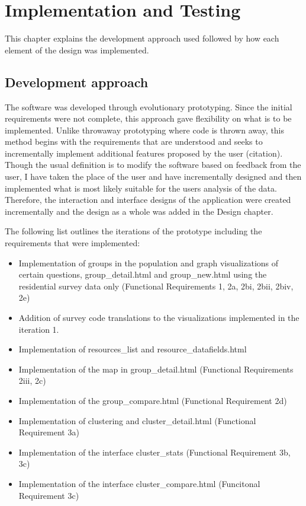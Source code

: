 \chapter{Implementation and Testing} \label{ch:implementation}
This chapter explains the development approach used followed by how each element of the design was implemented.


\section{Development approach} 
\label{sec:developmentapproach}
The software was developed through evolutionary prototyping. Since the initial requirements were not complete, this approach gave flexibility on what is to be implemented. Unlike throwaway prototyping where code is thrown away, this method begins with the requirements that are understood and seeks to incrementally implement additional features proposed by the user (citation). Though the usual definition is to modify the software based on feedback from the user, I have taken the place of the user and have incrementally designed and then implemented what is most likely suitable for the users\textsc{} analysis of the data. Therefore, the interaction and interface designs of the application were created incrementally and the design as a whole was added in the Design chapter.\par

The following list outlines the iterations of the prototype including the requirements that were implemented:
\begin{itemize}
	\item Implementation of groups in the population and graph visualizations of certain questions, group\_detail.html and group\_new.html using the residential survey data only (Functional Requirements 1, 2a, 2bi, 2bii, 2biv, 2e)
	\item Addition of survey code translations to the visualizations implemented in the iteration 1.
	\item Implementation of resources\_list and resource\_datafields.html
	\item Implementation of the map in group\_detail.html (Functional Requirements 2iii, 2c)
	\item Implementation of the group\_compare.html (Functional Requirement 2d)
	\item Implementation of clustering and cluster\_detail.html (Functional Requirement 3a)
	\item Implementation of the interface cluster\_stats (Functional Requirement 3b, 3c)
	\item Implementation of the interface cluster\_compare.html (Funcitonal Requirement 3c)
\end{itemize}

